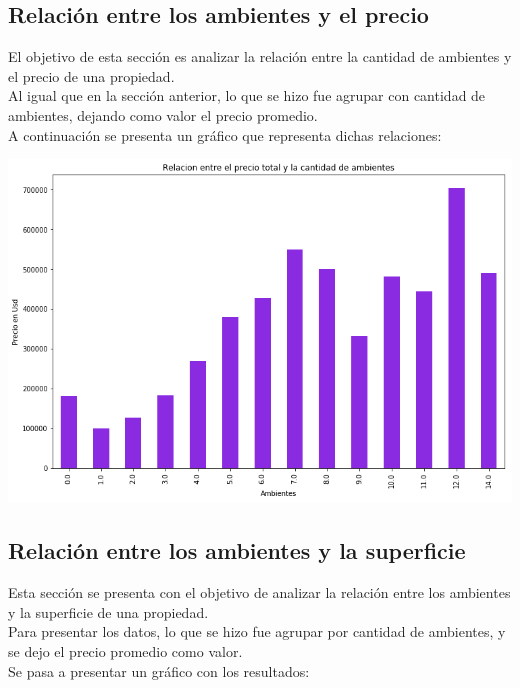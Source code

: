 \documentclass[a4paper, 10pt]{article}
\begin{document}
				\subsection{Relación entre los ambientes y el precio}
					El objetivo de esta sección es analizar la relación entre la cantidad de ambientes y el precio de una propiedad.
					\\
					Al igual que en la sección anterior, lo que se hizo fue agrupar con cantidad de ambientes, dejando como valor el precio promedio.
					\\
					A continuación se presenta un gráfico que representa dichas relaciones:
				
					\begin{center}    		
    					\includegraphics[width=\textwidth]{images/RelAmbPrec}    				
					\end{center}
				
				\subsection{Relación entre los ambientes y la superficie}
					Esta sección se presenta con el objetivo de analizar la relación entre los ambientes y la superficie de una propiedad.
					\\
					Para presentar los datos, lo que se hizo fue agrupar por cantidad de ambientes, y se dejo el precio promedio como valor.
					\\
					Se pasa a presentar un gráfico con los resultados:
					
\end{document}
